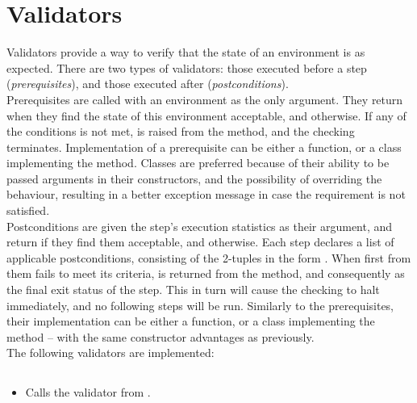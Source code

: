 \section{Validators}\label{sec:validators}

    Validators provide a way to verify that the state of an environment is as expected.
    There are two types of validators: those executed before a step (\textit{prerequisites}), and those executed after
    (\textit{postconditions}). \\

     \label{sec:prerequisites_desc} Prerequisites are called with an environment as the only argument.
    They return  when they find the state of this environment acceptable, and  otherwise.
    If any of the conditions is not met,  is raised from the
     method, and the checking terminates.
    Implementation of a prerequisite can be either a function, or a class implementing the  method.
    Classes are preferred because of their ability to be passed arguments in their constructors, and the possibility of
    overriding the  behaviour, resulting in a better exception message in case the requirement is not
    satisfied.\\

     \label{sec:postconditions_desc} Postconditions are given the step's execution statistics as their
    argument, and return  if they find them acceptable, and  otherwise.
    Each step declares a list of applicable postconditions, consisting of the 2-tuples in the form
    .
    When first from them fails to meet its criteria,  is returned from the
     method, and consequently as the final exit status of the step.
    This in turn will cause the checking to halt immediately, and no following steps will be run.
    Similarly to the prerequisites, their implementation can be either a function, or a class implementing the
     method -- with the same constructor advantages as previously.\\

    The following validators are implemented:

\subsection*{}\label{subsec:FileExistsPrerequisite}
\begin{itemize}[label={}]
    \item Calls the  validator from
          \hyperref[sec:Validators]{}.
\end{itemize}

